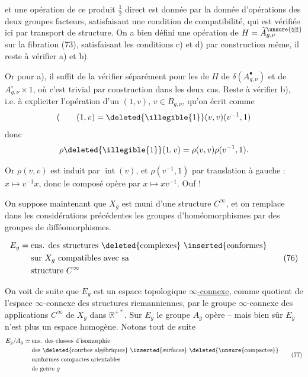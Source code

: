 
et une opération de ce produit \(\frac12\) direct est donnée  par  la donnée d'opérations des deux groupes facteurs, satisfaisant une condition de compatibilité, qui est vérifiée ici par transport de structure. On a bien défini une opération de \(H=\widetilde A_{g,\nu}^{\unsure{\natural|\sharp}}\) sur la fibration (73),  satisfaisant les conditions c) et d) par construction même, il reste à vérifier a) et b).

Or pour a), il suffit de la vérifier séparément pour les  de \(H\) de \(\delta(A_{g,\nu}^{\bullet})\) et de \(A_{g,\nu}^{\circ}\times 1\), où c'est trivial par construction dans les deux cas. Reste à vérifier b), i.e. à expliciter l'opération d'un  \((1,v)\), \(v\in B_{g,\nu}\), qu'on écrit comme
\[
 (\qquad (1,v)=\deleted{\illegible{1}}(v,v)(v^{-1},1)
\]
donc
\[
 \rho\deleted{\illegible{1}}(1,v)=\rho(v,v)\rho(v^{-1},1).
\]

Or \(\rho(v,v)\) est induit par \(\operatorname{int}(v)\),  et \(\rho(v^{-1},1)\) par translation à gauche : \(x\mapsto v^{-1}x\), donc le composé opère par \(x\mapsto xv^{-1}\). Ouf !


On suppose maintenant que \(X_g\) est muni d'une structure \(C^\infty\), et on remplace dans les considérations  précédentes les groupes d'homéomorphismes par des groupes de difféomorphismes.

\[
 \begin{aligned}
 E_g={}&\text{ens. des structures \deleted{complexes} \inserted{conformes}}\\
 &\text{sur }X_g\text{ compatibles avec sa}\\
 &\text{structure }C^\infty
 \end{aligned}
 \tag{76}
\]

 On voit de suite que \(E_g\) est un espace topologique \uline{\(\infty\)-connexe}, comme quotient de l'espace \(\infty\)-connexe  des structures riemanniennes, par le  groupe \(\infty\)-connexe des applications \(C^\infty\) de \(X_g\) dans \(\mathbb R^{+*}\). Sur \(E_g\) le groupe \(A_g\) opère -- mais bien sûr \(E_g\) n'est plus un espace homogène. Notons tout de suite
\[
 \begin{aligned}
 E_g/A_g\simeq{}&\text{ens. des classes d'isomorphie}\\
 &\text{des \deleted{courbes algébriques} \inserted{surfaces} \deleted{\unsure{compactes}}}\\
 &\text{conformes compactes orientables}\\
 &\text{de genre }g
 \end{aligned}
 \tag{77}
\]

